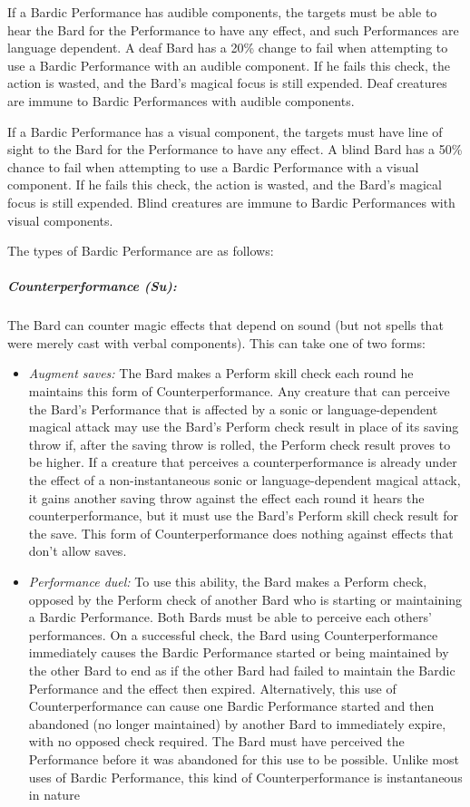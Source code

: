 If a Bardic Performance has audible components, the targets must be able to hear the Bard for the Performance to have any effect, and such Performances are language dependent. A deaf Bard has a 20\% change to fail when attempting to use a Bardic Performance with an audible component. If he fails this check, the action is wasted, and the Bard's magical focus is still expended. Deaf creatures are immune to Bardic Performances with audible components.

If a Bardic Performance has a visual component, the targets must have line of sight to the Bard for the Performance to have any effect. A blind Bard has a 50\% chance to fail when attempting to use a Bardic Performance with a visual component. If he fails this check, the action is wasted, and the Bard's magical focus is still expended. Blind creatures are immune to Bardic Performances with visual components.

The types of Bardic Performance are as follows:
\subparagraph{Counterperformance (Su):}
The Bard can counter magic effects that depend on sound (but not spells that were merely cast with verbal components). 
This can take one of two forms:
 
\begin{itemize}
 \item \emph{Augment saves:} The Bard makes a Perform skill check each round he maintains this form of Counterperformance.
Any creature that can perceive the Bard's Performance that is affected by a sonic or language-dependent magical attack may use the Bard's Perform check result in place of its saving throw if, after the saving throw is rolled, the Perform check result proves to be higher. 
If a creature that perceives a counterperformance is already under the effect of a non-instantaneous sonic or language-dependent magical attack, it gains another saving throw against the effect each round it hears the counterperformance, but it must use the Bard's Perform skill check result for the save. 
This form of Counterperformance does nothing against effects that don't allow saves.
 \item \emph{Performance duel:} To use this ability, the Bard makes a Perform check, opposed by the Perform check of another Bard who is starting or maintaining a Bardic Performance. Both Bards must be able to perceive each others' performances. On a successful check, the Bard using Counterperformance immediately causes the Bardic Performance started or being maintained by the other Bard to end as if the other Bard had failed to maintain the Bardic Performance and the effect then expired.
 Alternatively, this use of Counterperformance can cause one Bardic Performance started and then abandoned (no longer maintained) by another Bard to immediately expire, with no opposed check required. The Bard must have perceived the Performance before it was abandoned for this use to be possible.
 Unlike most uses of Bardic Performance, this kind of Counterperformance is instantaneous in nature
\end{itemize}

